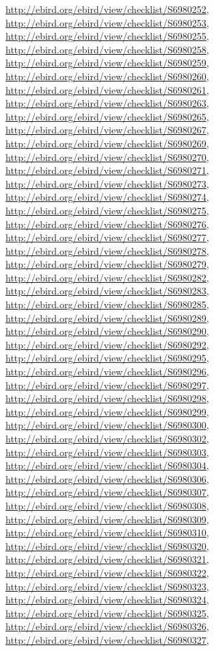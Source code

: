 \documentclass[9pt, article]{memoir}
\begin{document}
\begin{multicols}{2}
\url{http://ebird.org/ebird/view/checklist/S6980252}, 
\url{http://ebird.org/ebird/view/checklist/S6980253}, 
\url{http://ebird.org/ebird/view/checklist/S6980255}, 
\url{http://ebird.org/ebird/view/checklist/S6980258}, 
\url{http://ebird.org/ebird/view/checklist/S6980259}, 
\url{http://ebird.org/ebird/view/checklist/S6980260}, 
\url{http://ebird.org/ebird/view/checklist/S6980261}, 
\url{http://ebird.org/ebird/view/checklist/S6980263}, 
\url{http://ebird.org/ebird/view/checklist/S6980265}, 
\url{http://ebird.org/ebird/view/checklist/S6980267}, 
\url{http://ebird.org/ebird/view/checklist/S6980269}, 
\url{http://ebird.org/ebird/view/checklist/S6980270}, 
\url{http://ebird.org/ebird/view/checklist/S6980271}, 
\url{http://ebird.org/ebird/view/checklist/S6980273}, 
\url{http://ebird.org/ebird/view/checklist/S6980274}, 
\url{http://ebird.org/ebird/view/checklist/S6980275}, 
\url{http://ebird.org/ebird/view/checklist/S6980276}, 
\url{http://ebird.org/ebird/view/checklist/S6980277}, 
\url{http://ebird.org/ebird/view/checklist/S6980278}, 
\url{http://ebird.org/ebird/view/checklist/S6980279}, 
\url{http://ebird.org/ebird/view/checklist/S6980282}, 
\url{http://ebird.org/ebird/view/checklist/S6980283}, 
\url{http://ebird.org/ebird/view/checklist/S6980285}, 
\url{http://ebird.org/ebird/view/checklist/S6980289}, 
\url{http://ebird.org/ebird/view/checklist/S6980290}, 
\url{http://ebird.org/ebird/view/checklist/S6980292}, 
\url{http://ebird.org/ebird/view/checklist/S6980295}, 
\url{http://ebird.org/ebird/view/checklist/S6980296}, 
\url{http://ebird.org/ebird/view/checklist/S6980297}, 
\url{http://ebird.org/ebird/view/checklist/S6980298}, 
\url{http://ebird.org/ebird/view/checklist/S6980299}, 
\url{http://ebird.org/ebird/view/checklist/S6980300}, 
\url{http://ebird.org/ebird/view/checklist/S6980302}, 
\url{http://ebird.org/ebird/view/checklist/S6980303}, 
\url{http://ebird.org/ebird/view/checklist/S6980304}, 
\url{http://ebird.org/ebird/view/checklist/S6980306}, 
\url{http://ebird.org/ebird/view/checklist/S6980307}, 
\url{http://ebird.org/ebird/view/checklist/S6980308}, 
\url{http://ebird.org/ebird/view/checklist/S6980309}, 
\url{http://ebird.org/ebird/view/checklist/S6980310}, 
\url{http://ebird.org/ebird/view/checklist/S6980320}, 
\url{http://ebird.org/ebird/view/checklist/S6980321}, 
\url{http://ebird.org/ebird/view/checklist/S6980322}, 
\url{http://ebird.org/ebird/view/checklist/S6980323}, 
\url{http://ebird.org/ebird/view/checklist/S6980324}, 
\url{http://ebird.org/ebird/view/checklist/S6980325}, 
\url{http://ebird.org/ebird/view/checklist/S6980326}, 
\url{http://ebird.org/ebird/view/checklist/S6980327}, 

\end{multicols}
\end{document}
